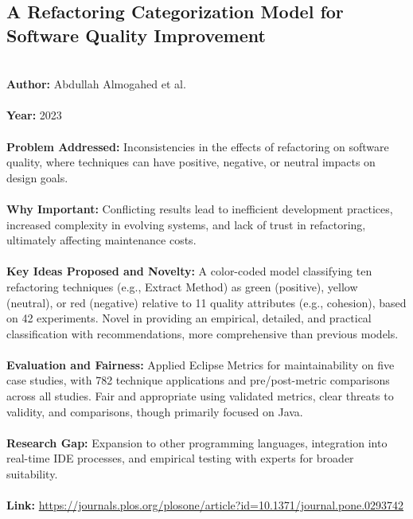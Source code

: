 \documentclass[12pt]{article}
\begin{document}
\subsection*{A Refactoring Categorization Model for Software Quality Improvement}
\\
\textbf{Author:} Abdullah Almogahed et al. \\
\\
\textbf{Year:} 2023 \\
\\
\textbf{Problem Addressed:} Inconsistencies in the effects of refactoring on software quality, where techniques can have positive, negative, or neutral impacts on design goals. \\
\\
\textbf{Why Important:} Conflicting results lead to inefficient development practices, increased complexity in evolving systems, and lack of trust in refactoring, ultimately affecting maintenance costs. \\
\\
\textbf{Key Ideas Proposed and Novelty:} A color-coded model classifying ten refactoring techniques (e.g., Extract Method) as green (positive), yellow (neutral), or red (negative) relative to 11 quality attributes (e.g., cohesion), based on 42 experiments. Novel in providing an empirical, detailed, and practical classification with recommendations, more comprehensive than previous models. \\
\\
\textbf{Evaluation and Fairness:} Applied Eclipse Metrics for maintainability on five case studies, with 782 technique applications and pre/post-metric comparisons across all studies. Fair and appropriate using validated metrics, clear threats to validity, and comparisons, though primarily focused on Java. \\
\\
\textbf{Research Gap:} Expansion to other programming languages, integration into real-time IDE processes, and empirical testing with experts for broader suitability. \\
\\
\textbf{Link:} \url{https://journals.plos.org/plosone/article?id=10.1371/journal.pone.0293742}
\pagebreak

\end{document}
